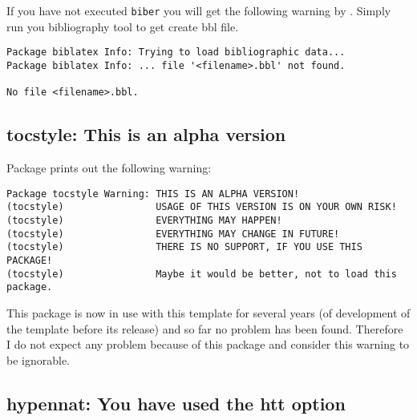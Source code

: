 If you have not executed \texttt{biber} you will get the following warning by
. Simply run you bibliography tool to get create bbl file.

\begin{verbatim}
Package biblatex Info: Trying to load bibliographic data...
Package biblatex Info: ... file '<filename>.bbl' not found.

No file <filename>.bbl.
\end{verbatim}

%

\subsection{tocstyle: This is an alpha version}

Package  prints out the following warning:
%
\begin{verbatim}
Package tocstyle Warning: THIS IS AN ALPHA VERSION!
(tocstyle)                USAGE OF THIS VERSION IS ON YOUR OWN RISK!
(tocstyle)                EVERYTHING MAY HAPPEN!
(tocstyle)                EVERYTHING MAY CHANGE IN FUTURE!
(tocstyle)                THERE IS NO SUPPORT, IF YOU USE THIS PACKAGE!
(tocstyle)                Maybe it would be better, not to load this package.
\end{verbatim}
%
This package is now in use with this template for several years (of development of the template before its release) and so far no problem has been found. Therefore I do not expect any problem because of this package and consider this warning to be ignorable.

\subsection{hypennat: You have used the htt option}

